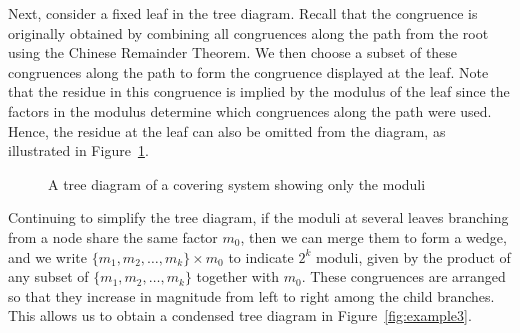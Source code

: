 \documentclass[12pt]{article}
\theoremstyle{definition}
\begin{document}
Next, consider a fixed leaf in the tree diagram. Recall that the congruence is originally obtained by combining all congruences along the path from the root using the Chinese Remainder Theorem. We then choose a subset of these congruences along the path to form the congruence displayed at the leaf. Note that the residue in this congruence is implied by the modulus of the leaf since the factors in the modulus determine which congruences along the path were used. Hence, the residue at the leaf can also be omitted from the diagram, as illustrated in Figure~\ref{fig:example2}.
\begin{figure}[H]
\centering
{}
\caption{A tree diagram of a covering system showing only the moduli}
\label{fig:example2}
\end{figure}

Continuing to simplify the tree diagram, if the moduli at several leaves branching from a node share the same factor $m_0$, then we can merge them to form a wedge, and we write $\{m_1,m_2,\dotsc,m_k\}\times m_0$ to indicate $2^k$ moduli, given by the product of any subset of $\{m_1,m_2,\dotsc,m_k\}$ together with $m_0$. These congruences are arranged so that they increase in magnitude from left to right among the child branches. This allows us to obtain a condensed tree diagram in Figure~\ref{fig:example3}.
\end{document}
